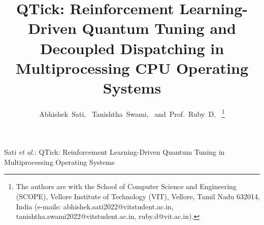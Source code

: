\documentclass[journal]{IEEEtran}
\begin{document}
\title{QTick: Reinforcement Learning-Driven Quantum Tuning and Decoupled Dispatching in Multiprocessing CPU Operating Systems}

\author{Abhishek~Sati,~
        Tanishtha~Swami,~
        and~Prof.~Ruby~D,~%
\thanks{The authors are with the School of Computer Science and Engineering (SCOPE), Vellore Institute of Technology (VIT), Vellore, Tamil Nadu 632014, India (e-mails: abhishek.sati2022@vitstudent.ac.in, tanishtha.swami2022@vitstudent.ac.in, ruby.d@vit.ac.in).}}

%
{Sati \MakeLowercase{\textit{et al.}}: QTick: Reinforcement Learning-Driven Quantum Tuning in Multiprocessing Operating Systems}

\maketitle
\end{document}
